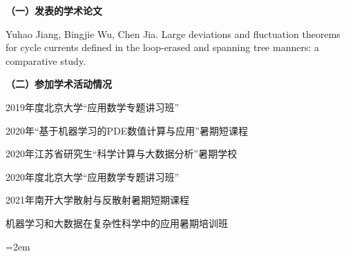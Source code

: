 
\setlength{\parindent}{0em}
\textbf{（一）发表的学术论文}
\begin{publist}
\item Yuhao Jiang, Bingjie Wu, Chen Jia. Large deviations and fluctuation theorems for cycle currents defined in the loop-erased and spanning tree manners: a comparative study. 
\end{publist}

\textbf{（二）参加学术活动情况}
\begin{publist}
\item 2019年度北京大学“应用数学专题讲习班”
\item 2020年“基于机器学习的PDE数值计算与应用”暑期短课程
\item 2020年江苏省研究生“科学计算与大数据分析”暑期学校
\item 2020年度北京大学“应用数学专题讲习班”
\item 2021年南开大学散射与反散射暑期短期课程
\item 机器学习和大数据在复杂性科学中的应用暑期培训班
\end{publist}
\vfill
{}\hangindent=2em\noindent

\setlength{\parindent}{2em}
